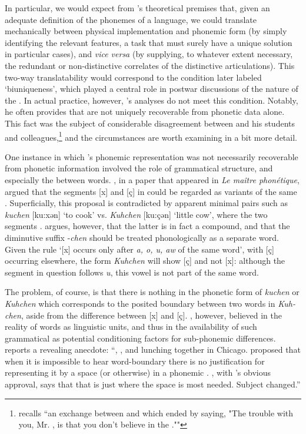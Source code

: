 In particular, we would expect from {\Bloomfield}'s theoretical premises
that, given an adequate definition of the phonemes of a language, we
could translate mechanically between physical implementation and
phonemic form (by simply identifying the relevant features, a task
that must surely have a unique solution in particular cases), and
\emph{vice versa} (by supplying, to whatever extent necessary, the
redundant or non-distinctive correlates of the distinctive
articulations). This two-way translatability would correspond to the
condition later labeled `biuniqueness', which played a central role in
postwar discussions of the nature of the . In actual practice,
however, {\Bloomfield}'s analyses do not meet this condition. Notably, he
often provides  that are not uniquely
recoverable from phonetic data alone. This fact was the subject of
considerable disagreement between {\Bloomfield} and his students and
colleagues,\footnote{\citet[70]{cowan91:1st.pers.sg.2} recalls ``an
  exchange between  and  which ended
  by {\Hockett} saying, "The trouble with you, Mr. {\Bloomfield}, is that
  you don't believe in the .""} and the
circumstances are worth examining in a bit more detail.

One instance in which {\Bloomfield}'s phonemic representation was not
necessarily recoverable from phonetic information involved the role of
grammatical structure, and especially the  between
words. \citet{bloomfield30:german.velars}, in a paper that appeared in
\textsl{Le maître phonétique}, argued that the segments [x] and [ç] in
 could be regarded as variants of the same
. Superficially, this proposal is contradicted by apparent
minimal pairs such as \emph{kuchen} [ku:xən] `to cook'
vs. \emph{Kuhchen} [ku:çən] `little cow', where the two segments
. {\Bloomfield} argues, however, that the latter is in fact a
compound, and that the diminutive suffix -\emph{chen} should be
treated phonologically as a separate word. Given the rule `[x] occurs
only after \emph{a, o, u, aw} of the same word', with [ç] occurring
elsewhere, the form \emph{Kuhchen} will show [ç] and not [x]: although
the segment in question follows \emph{u}, this vowel is not part of
the same word.

The problem, of course, is that there is nothing in the phonetic form
of \emph{kuchen} or \emph{Kuhchen} which corresponds to the posited
boundary between two words in \emph{Kuh-chen}, aside from the
difference between [x] and [ç]. {\Bloomfield}, however, believed in the
reality of words as linguistic units, and thus in the availability of
such grammatical  as potential conditioning factors for
sub-phonemic differences. \citet[542]{hockett70:bloomfield.anthology}
reports a revealing anecdote: ``{\Bloomfield}, {\Hoijer}, and {\Hockett}
lunching together in Chicago. {\Hockett} proposed that when it is
impossible to hear word-boundary there is no justification for
representing it by a space (or otherwise) in a phonemic
. {\Hoijer}, with {\Bloomfield}'s obvious approval, says that
that is just where the space is most needed. Subject changed.''

